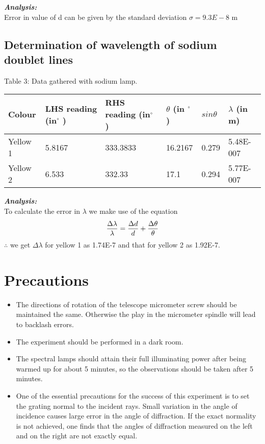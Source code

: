 \documentclass[11pt]{article}
\begin{document}
\textbf{\emph{Analysis:}}\\
Error in value of d can be given by the standard deviation $\sigma = 9.3 E -8$ m 
\subsection{Determination of wavelength of sodium doublet lines}

\pagebreak
Table 3: Data gathered with sodium lamp.
\begin{table}[h]
\begin{tabular}{|l|l|l|l|l|l|}
\hline
Colour   & LHS reading (in$^{\circ}$ )        & RHS reading (in$^{\circ}$ )        & $\theta$ (in $^\circ$)           & $sin\theta$         & $\lambda$ (in m)                    \\ \hline
Yellow 1 & 5.8167 & 333.3833 & 16.2167 & 0.279 & 5.48E-007   \\
Yellow 2 & 6.533 & 332.33 & 17.1        & 0.294 & 5.77E-007  \\
\hline
\end{tabular}
\end{table}


\textbf{\emph{Analysis:}}\\
To calculate the error in $\lambda$ we make use of the equation 
\begin{equation}
    \frac{\Delta \lambda}{\lambda} = \frac{\Delta d}{d} + \frac{\Delta \theta}{\theta}\\
    
\end{equation}
$\therefore $ we get $ \Delta \lambda$ for yellow 1 as 1.74E-7 and that for yellow 2 as 1.92E-7. 
\section{Precautions}
\begin{itemize}

    \item  The directions of rotation of the telescope micrometer screw should be maintained the
same. Otherwise the play in the micrometer spindle will lead to backlash errors.
    \item  The experiment should be performed in a dark room.
    \item  The spectral lamps should attain their full illuminating power after being warmed up for
about 5 minutes, so the observations should be taken after 5 minutes.
    \item One of the essential precautions for the success of this experiment is to set the grating
normal to the incident rays. Small variation in the angle of incidence causes large error
in the angle of diffraction. If the exact normality is not achieved, one finds that the angles
of diffraction measured on the left and on the right are not exactly equal.
\end{itemize}
\end{document}
